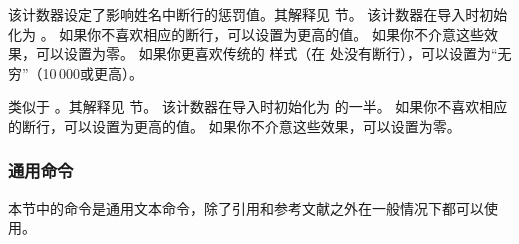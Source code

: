 \begin{ltxsyntax}
该计数器设定了影响姓名中断行的惩罚值。其解释见  节。
该计数器在导入时初始化为 。
如果你不喜欢相应的断行，可以设置为更高的值。
如果你不介意这些效果，可以设置为零。
如果你更喜欢传统的 \BibTeX 样式（在  处没有断行），可以设置为“无穷”（10\,000或更高）。



类似于 。其解释见  节。
该计数器在导入时初始化为  的一半。
如果你不喜欢相应的断行，可以设置为更高的值。
如果你不介意这些效果，可以设置为零。

\end{ltxsyntax}

\subsubsection{通用命令}%
\label{use:fmt:aux}

本节中的命令是通用文本命令，除了引用和参考文献之外在一般情况下都可以使用。

